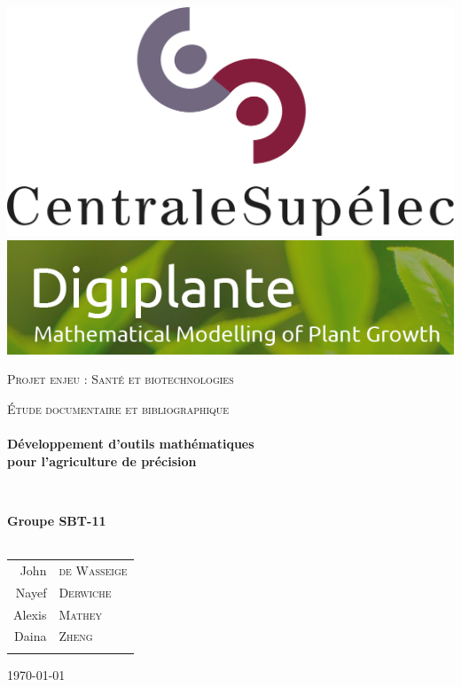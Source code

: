 \begin{titlepage}
\begin{center}

\includegraphics[scale=0.5]{./img/logo_centralesup.jpg} \hfill
\includegraphics[scale=0.3]{./img/logo_digiplante.png}

\vfill 

\textsc{\Large Projet enjeu : Santé et biotechnologies}\\[0.5cm]

\vfill

\textsc{\Large \'Etude documentaire et bibliographique}\\[1.5cm] 

\HRule \\[0.4cm]
{ \LARGE \bfseries Développement d'outils mathématiques \\ 
   pour l'agriculture de précision \\[0.4cm] }

\HRule \\[1.5cm]

\vfill

{\large
\begin{center}
  \textbf{Groupe SBT-11} \\~\\
\begin{tabular}{rl}
    \quad John &\textsc{de Wasseige} \\
    \quad Nayef &\textsc{Derwiche} \\
    \quad Alexis &\textsc{Mathey} \\
    \quad Daina &\textsc{Zheng} \\ \\
\end{tabular}
\end{center}
}

\vfill

{\large \today}

\end{center}
\end{titlepage}